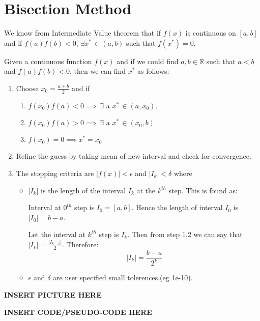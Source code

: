 \documentclass[
]{book}
\begin{document}
\hypertarget{bisection-method}{%
\section{Bisection Method}\label{bisection-method}}

We know from Intermediate Value theorem that if \(f(x)\) is continuous on \([a,b]\) and if \(f(a) f(b)<0\), \(\exists x^* \, \in(a,b)\) such that \(f(x^*)=0\).

Given a continuous function \(f(x)\) and if we could find \(a,b\in \mathbb{R}\) such that \(a<b\) and \(f(a) f(b)<0\), then we can find \(x^*\) as follows:

\begin{enumerate}
\def\labelenumi{\arabic{enumi}.}
\item
  Choose \(x_0 = \frac{a+b}{2}\) and if

  \begin{enumerate}
  \def\labelenumii{\alph{enumii}.}
  \item
    \(f(x_0) f(a)<0 \implies \ \exists \text{ a } x^*\, \in (a,x_0)\).
  \item
    \(f(x_0) f(a)>0 \implies \ \exists \text{ a } x^*\, \in (x_0,b)\)
  \item
    \(f(x_0) =0 \implies x^* = x_0\)
  \end{enumerate}
\item
  Refine the guess by taking mean of new interval and check for convergence.
\item
  The stopping criteria are \(|f(x)|<\epsilon\) and \(|I_k|<\delta\) where

  \begin{itemize}
  \item
    \(|I_k|\) is the length of the interval \(I_k\) at the \(k^{th}\) step. This is found as:

    Interval at \(0^{th}\) step is \(I_0 = [a,b]\). Hence the length of interval \(I_0\) is \(|I_0|= b-a\).

    Let the interval at \(k^{th}\) step is \(I_k\). Then from step 1,2 we can say that \(|I_k| = \frac{|I_{k-1}|}{2}\). Therefore: \[|I_k| = \frac{b-a}{2^k}\]
  \item
    \(\epsilon\) and \(\delta\) are user specified small tolerences.(eg 1e-10).
  \end{itemize}
\end{enumerate}

\textbf{INSERT PICTURE HERE}

\textbf{INSERT CODE/PSEUDO-CODE HERE}
\end{document}
